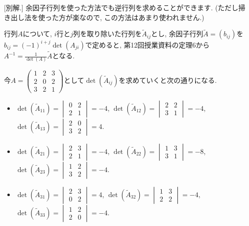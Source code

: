 \documentclass[dvipdfmx,a4paper,11pt]{article}
\theoremstyle{definition}
\begin{document}
[別解.]
余因子行列を使った方法でも逆行列を求めることができます. (ただし掃き出し法を使った方が楽なので, この方法はあまり使われません.)

行列$A$について, $i$行と$j$列を取り除いた行列を$\tilde{A}_{ij}$とし, 
余因子行列$\tilde{A}=(b_{ij})$を$b_{ij}=(-1)^{i+j}\det(A_{ji})$で定めると, 第12回授業資料の定理6から$A^{-1} = \frac{1}{\det(A)} \tilde{A}$となる.

今$A= \begin{pmatrix}
1 &2&3 \\
2 & 0 & 2 \\
3&2 &1 
 \end{pmatrix}$として$\det(\tilde{A}_{ij})$を求めていくと次の通りになる.
 
 \begin{itemize}
 \item $\det(\tilde{A}_{11}) = 
 \begin{vmatrix}
 0 & 2 \\
2 &1 
 \end{vmatrix}
 = -4 $, 
 $\det(\tilde{A}_{12}) = 
 \begin{vmatrix}
 2& 2 \\
3&1 
 \end{vmatrix}
 = -4 $, 
 $\det(\tilde{A}_{13}) = 
 \begin{vmatrix}
 2& 0 \\
3&2
 \end{vmatrix}
 = 4 $.
 \item 
 $\det(\tilde{A}_{21}) = 
 \begin{vmatrix}
 2& 3 \\
2&1 
 \end{vmatrix}
 = -4 $, 
 $\det(\tilde{A}_{22}) = 
 \begin{vmatrix}
 1& 3 \\
3&1 
 \end{vmatrix}
 = -8 $, 
 $\det(\tilde{A}_{23}) = 
 \begin{vmatrix}
 1& 2 \\
3&2 
 \end{vmatrix}
 = -4 $.
 \item 
 $\det(\tilde{A}_{31}) = 
 \begin{vmatrix}
 2& 3 \\
0&2
 \end{vmatrix}
 = 4 $, 
 $\det(\tilde{A}_{32}) = 
 \begin{vmatrix}
 1& 3 \\
2&2
 \end{vmatrix}
 = -4 $, 
 $\det(\tilde{A}_{33}) = 
 \begin{vmatrix}
 1& 2 \\
2&0
 \end{vmatrix}
 = -4 $.
 \end{itemize}
\end{document}
